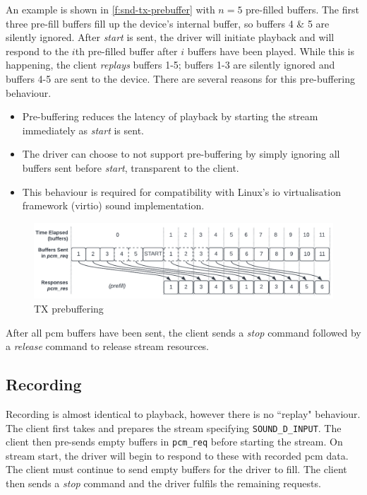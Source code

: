 \documentclass[a4paper,12pt]{report}
\newcommand{\code}[1]{\texttt{#1}}
\begin{document}
An example is shown in \autoref{f:snd-tx-prebuffer} with $n=5$ pre-filled
buffers. The first three pre-fill buffers fill up the device's internal buffer,
so buffers 4 \& 5 are silently ignored. After \textit{start} is sent, the driver
will initiate playback and will respond to the $i$th pre-filled buffer after $i$
buffers have been played. While this is happening, the client \textit{replays}
buffers 1-5; buffers 1-3 are silently ignored and buffers 4-5 are sent to the
device. There are several reasons for this pre-buffering behaviour.
\begin{itemize}
  \item Pre-buffering reduces the latency of playback by starting the stream
  immediately as \textit{start} is sent.

  \item The driver can choose to not support pre-buffering by simply ignoring
  all buffers sent before \textit{start}, transparent to the client.

  \item This behaviour is required for compatibility with Linux's \gls{io}
    virtualisation framework (\gls{virtio}) sound
  implementation.
\end{itemize}

\begin{figure}[th]
  \centering
  \includegraphics[width=\textwidth]{snd-tx-prebuffer}
  \caption{TX prebuffering}
  \label{f:snd-tx-prebuffer}
\end{figure}

After all \gls{pcm} buffers have been sent, the client sends a \textit{stop} command
followed by a \textit{release} command to release stream resources.

\subsection{Recording}

Recording is almost identical to playback, however there is no ``replay"
behaviour. The client first takes and prepares the stream specifying
\code{SOUND\_D\_INPUT}.  The client then pre-sends empty buffers in
\code{pcm\_req} before starting the stream. On stream start, the driver will
begin to respond to these with recorded \gls{pcm} data. The client must continue to
send empty buffers for the driver to fill. The client then sends a \textit{stop}
command and the driver fulfils the remaining requests.
\end{document}
